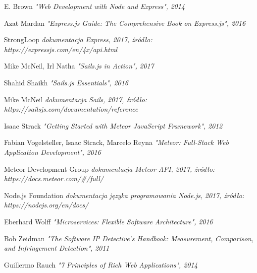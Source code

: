 \documentclass[12pt]{report}
\begin{document}
\begin{thebibliography}{99}
    E. Brown
    \textit{"Web Development with Node and Express", 2014}

    Azat Mardan
    \textit{"Express.js Guide: The Comprehensive Book on Express.js", 2016}

    StrongLoop
    \textit{dokumentacja Express, 2017, źródło: https://expressjs.com/en/4x/api.html}

    Mike McNeil, Irl Natha
    \textit{"Sails.js in Action", 2017}

    Shahid Shaikh
    \textit{"Sails.js Essentials", 2016}

    Mike McNeil
    \textit{dokumentacja Sails, 2017, źródło: https://sailsjs.com/documentation/reference}

    Isaac Strack
    \textit{"Getting Started with Meteor JavaScript Framework", 2012}

    Fabian Vogelsteller, Isaac Strack, Marcelo Reyna
    \textit{"Meteor: Full-Stack Web Application Development", 2016}

    Meteor Development Group
    \textit{dokumentacja Meteor API, 2017, źródło: https://docs.meteor.com/\#/full/}

    Node.js Foundation
    \textit{dokumentacja języka programowania Node.js, 2017, źródło: https://nodejs.org/en/docs/}

    Eberhard Wolff
    \textit{"Microservices: Flexible Software Architecture", 2016}

    Bob Zeidman
    \textit{"The Software IP Detective's Handbook: Measurement, Comparison, and Infringement Detection", 2011}
    
    Guillermo Rauch
    \textit{"7 Principles of Rich Web Applications", 2014}

\end{thebibliography}


\listoffigures
\end{document}
